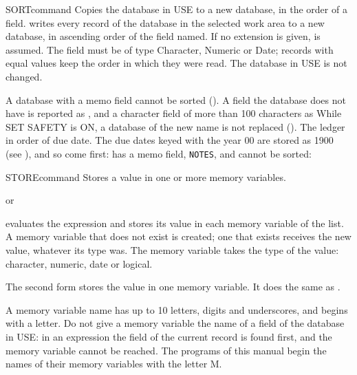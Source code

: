 \begin{XbaseEntry}{SORT}{command}
Copies the database in USE to a new database, in the order of a field.
\Syntax
{}
\Usage
{} writes every record of the database in the selected work area to
a new database, in ascending order of the field named.  If no extension is
given,  is assumed.  The field must be of type Character, Numeric
or Date; records with equal values keep the order in which they were read.
The database in USE is not changed.

A database with a memo field cannot be sorted ().  A field the database does not have is reported as
, and a character field of more than 100
characters as   While SET
SAFETY is ON, a database of the new name is not replaced
().
\Examples
The ledger in order of due date.  The due dates keyed with the year 00 are
stored as 1900 (see ), and so come first:
 has a memo field, \texttt{NOTES}, and cannot be sorted:
\end{XbaseEntry}

\begin{XbaseEntry}{STORE}{command}
Stores a value in one or more memory variables.
\Syntax
{}
\par or\par
{}
\Usage
{} evaluates the expression and stores its value in each memory
variable of the list.  A memory variable that does not exist is created; one
that exists receives the new value, whatever its type was.  The memory
variable takes the type of the value: character, numeric, date or logical.

The second form stores the value in one memory variable.  It does the same as
.

A memory variable name has up to 10 letters, digits and underscores, and
begins with a letter.  Do not give a memory variable the name of a field of the
database in USE: in an expression the field of the current record is found
first, and the memory variable cannot be reached.  The programs of this manual
begin the names of their memory variables with the letter M.
\Examples
{}
\end{XbaseEntry}

